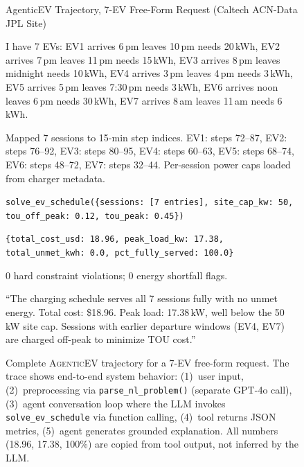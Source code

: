 \begin{figure}[htb]
\centering
\begin{minipage}{0.94\linewidth}
\begin{promptfigure}{AgenticEV Trajectory, 7-EV Free-Form Request (Caltech ACN-Data JPL Site)}
\footnotesize
{\ttfamily\small
{} I have 7 EVs: EV1 arrives 6\,pm leaves 10\,pm needs 20\,kWh, EV2 arrives 7\,pm leaves 11\,pm needs 15\,kWh, EV3 arrives 8\,pm leaves midnight needs 10\,kWh, EV4 arrives 3\,pm leaves 4\,pm needs 3\,kWh, EV5 arrives 5\,pm leaves 7:30\,pm needs 3\,kWh, EV6 arrives noon leaves 6\,pm needs 30\,kWh, EV7 arrives 8\,am leaves 11\,am needs 6\,kWh.\par\vspace{1mm}
 Mapped 7 sessions to 15-min step indices. EV1: steps 72--87, EV2: steps 76--92, EV3: steps 80--95, EV4: steps 60--63, EV5: steps 68--74, EV6: steps 48--72, EV7: steps 32--44. Per-session power caps loaded from charger metadata.\par\vspace{1mm}
 \texttt{solve\_ev\_schedule(\{sessions: [7 entries], site\_cap\_kw: 50, tou\_off\_peak: 0.12, tou\_peak: 0.45\})}\par\vspace{1mm}
 \texttt{\{total\_cost\_usd: 18.96, peak\_load\_kw: 17.38, total\_unmet\_kwh: 0.0, pct\_fully\_served: 100.0\}}\par\vspace{1mm}
 0 hard constraint violations; 0 energy shortfall flags.\par\vspace{1mm}
 ``The charging schedule serves all 7 sessions fully with no unmet energy. Total cost: \$18.96. Peak load: 17.38\,kW, well below the 50\,kW site cap. Sessions with earlier departure windows (EV4, EV7) are charged off-peak to minimize TOU cost.''}
\end{promptfigure}
\end{minipage}
\caption{Complete \textsc{AgenticEV} trajectory for a 7-EV free-form request. The trace shows end-to-end system behavior: (1)~user input, (2)~preprocessing via \texttt{parse\_nl\_problem()} (separate GPT-4o call), (3)~agent conversation loop where the LLM invokes \texttt{solve\_ev\_schedule} via function calling, (4)~tool returns JSON metrics, (5)~agent generates grounded explanation. All numbers (18.96, 17.38, 100\%) are copied from tool output, not inferred by the LLM.}
\label{fig:ev_trajectory}
\end{figure}

